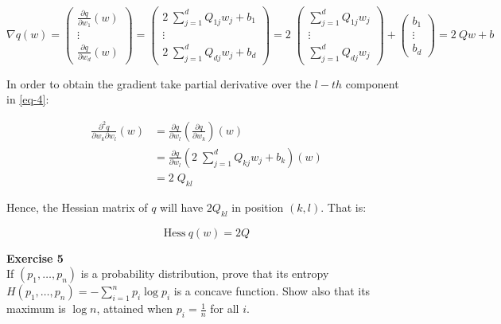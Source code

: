 \documentclass[11pt,table]{article}
\newenvironment{problem}[2][Exercise]
    { \begin{mdframed}[backgroundcolor=gray!20] \textbf{#1 #2} \\}
    {  \end{mdframed}}
\begin{document}
\[
	\nabla q(w) = \begin{pmatrix}
		\frac{\partial q}{\partial w_1} (w) \\
		\vdots \\
		\frac{\partial q}{\partial w_d} (w)
	\end{pmatrix}
	= \begin{pmatrix}
		2 \; \sum_{j=1}^{d} Q_{1j} w_{j} + b_{1} \\
		\vdots \\
		2 \; \sum_{j=1}^{d} Q_{dj} w_{j} + b_{d}
	\end{pmatrix}
	= 2 \; \begin{pmatrix}
		\sum_{j=1}^{d} Q_{1j} w_{j} \\
		\vdots \\
		\sum_{j=1}^{d} Q_{dj} w_{j}
	\end{pmatrix} + \begin{pmatrix}
		b_{1} \\
		\vdots \\
		b_{d}
	\end{pmatrix}
	= 2 \ Qw + b
\]

In order to obtain the gradient take partial derivative over the \(l-th\) component in \ref{eq-4}:
 
\begin{align*}
	\frac{\partial^2 q}{\partial w_k \partial w_l} (w) & = \frac{\partial q}{\partial w_l} \left( \frac{\partial q}{\partial w_k} \right) (w) \\
	& = \frac{\partial q}{\partial w_l} \left( 2 \; \sum_{j=1}^{d} Q_{kj} w_{j} + b_{k} \right) (w) \\
	& = 2 \; Q_{kl}
\end{align*}

Hence, the Hessian matrix of \(q\) will have \(2 Q_{kl}\) in position \((k, l)\). That is:

\[
	\text{Hess} \ q(w) = 2Q
\]

\begin{problem}{5}
	If \( (p_1,\dots,p_n) \) is a probability distribution, prove that its entropy \( H(p_1, \dots, p_n) = - \sum_{i=1}^n p_i \log p_i\) is a concave function. Show also that its maximum is \( \log n \), attained when \( p_i = \frac{1}{n}\) for all $i$.
\end{problem}
\end{document}
